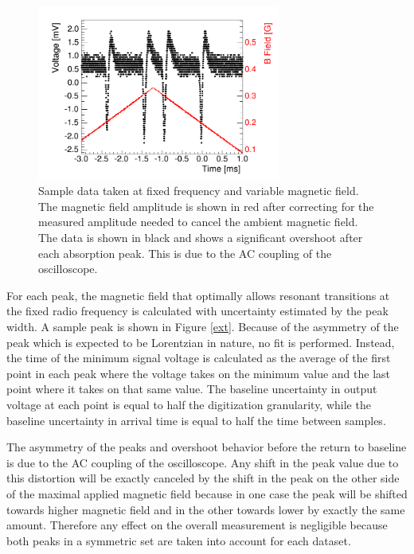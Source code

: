 \begin{figure}[htb]
\includegraphics[width=8cm]{abs_peaks.png}
\caption{Sample data taken at fixed frequency and variable magnetic field. The magnetic field amplitude is shown in red after correcting for the measured amplitude needed to cancel the ambient magnetic field. The data is shown in black and shows a significant overshoot after each absorption peak. This is due to the AC coupling of the oscilloscope.}
\label{res}
\end{figure}

For each peak, the magnetic field that optimally allows resonant transitions at the fixed radio frequency is calculated with uncertainty estimated by the peak width. A sample peak is shown in Figure \ref{ext}. Because of the asymmetry of the peak which is expected to be Lorentzian in nature, no fit is performed. Instead, the time of the minimum signal voltage is calculated as the average of the first point in each peak where the voltage takes on the minimum value and the last point where it takes on that same value. The baseline uncertainty in output voltage at each point is equal to half the digitization granularity, while the baseline uncertainty in arrival time is equal to half the time between samples.

The asymmetry of the peaks and overshoot behavior before the return to baseline is due to the AC coupling of the oscilloscope. Any shift in the peak value due to this distortion will be exactly canceled by the shift in the peak on the other side of the maximal applied magnetic field because in one case the peak will be shifted towards higher magnetic field and in the other towards lower by exactly the same amount. Therefore any effect on the overall measurement is negligible because both peaks in a symmetric set are taken into account for each dataset.

